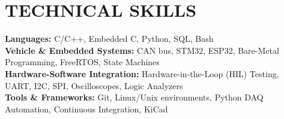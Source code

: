 \documentclass[letterpaper,11pt]{article}
\begin{document}
\section{TECHNICAL SKILLS}
 \begin{itemize}[leftmargin=0.15in, label={}]
    \small{\item{
     \textbf{Languages:} C/C++, Embedded C, Python, SQL, Bash \\
     \textbf{Vehicle \& Embedded Systems:} CAN bus, STM32, ESP32, Bare-Metal Programming, FreeRTOS, State Machines \\
     \textbf{Hardware-Software Integration:} Hardware-in-the-Loop (HIL) Testing, UART, I2C, SPI, Oscilloscopes, Logic Analyzers \\
     \textbf{Tools \& Frameworks:} Git, Linux/Unix environments, Python DAQ Automation, Continuous Integration, KiCad
    }}
 \end{itemize}


\end{document}
